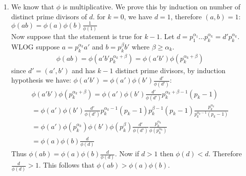\begin{enumerate}[label=]
    \item 
        We know that $\phi$ is multiplicative. We prove this by induction on number of distinct prime divisors of $d$. for $k = 0$, we have $d = 1$, therefore $(a, b) = 1$: $\phi(ab) = \phi(a) \phi(b) \frac{1}{\phi(1)}$ \\
        Now suppose that the statement is true for $k - 1$. Let $d = p_1^{\alpha_1} \dots p_k^{\alpha_k} = d' p_k^{\alpha_k}$. WLOG suppose $a = p_k^{\alpha_k} a'$ and $b = p_k^\beta b'$ where $\beta \ge \alpha_k$.
        \begin{gather*}
            \phi(ab) = \phi(a'b' p_k^{\alpha_k + \beta}) = \phi(a'b') \phi(p_k^{\alpha_k + \beta})
        \end{gather*}
        since $d' = (a', b')$ and has $k - 1$ distinct prime divisors, by induction hypothesis we have: $\phi(a'b') = \phi(a') \phi(b') \frac{d'}{\phi(d')}$:
        \begin{gather*}
            \phi(a'b') \phi(p_k^{\alpha_k + \beta}) = \phi(a')\phi(b') \frac{d'}{\phi(d')} p_k^{\alpha_k + \beta - 1} (p_k - 1) \\
            = \phi(a')\phi(b') \frac{d'}{\phi(d')} p_k^{\alpha_k - 1} (p_k - 1) p_k^{\beta - 1} (p_k - 1) \frac{p_k^{\alpha_k}}{p_k^{\alpha_k - 1} (p_k - 1)} \\
            = \phi(a') \phi(p_k^{\alpha_k}) \phi(b') \phi(p_k^\beta) \frac{d'}{\phi(d')} \frac{p_k^{\alpha_k}}{\phi(p_k^{\alpha_k})} \\
            = \phi(a) \phi(b) \frac{d }{\phi(d)}
        \end{gather*}
        Thus $\phi(ab) = \phi(a) \phi(b) \frac{d }{\phi(d)}$.
        Now if $d > 1$ then $\phi(d) < d$. Therefore $\frac{d }{\phi(d)} > 1$. This follows that $\phi(ab) > \phi(a) \phi(b)$.
\end{enumerate}